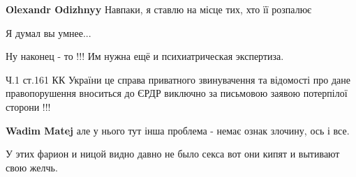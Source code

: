 \begin{itemize}
\begin{itemize}
\textbf{Olexandr Odizhnyy} Навпаки, я ставлю на місце тих, хто її розпалює
\end{itemize}

 
Я думал вы умнее...

 
Ну наконец - то !!! Им нужна ещё и психиатрическая экспертиза.

 

Ч.1 ст.161 КК України це справа приватного звинувачення та відомості про дане
правопорушення вноситься до ЄРДР виключно за письмовою заявою потерпілої
сторони !!!

\begin{itemize}
 
\textbf{Wadim Matej} але у нього тут інша проблема - немає ознак злочину, ось і все. \Smiley[1.0][yellow]
\end{itemize}

 
У этих фарион и ницой видно давно не было секса вот они кипят и вытивают свою желчь.

 


\end{itemize}

